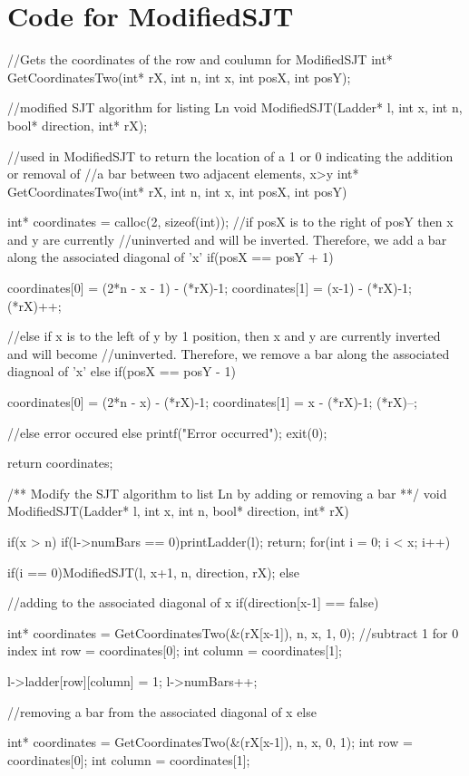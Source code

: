 \section{Code for {\sc ModifiedSJT}}

\begin{singlespace}
\begin{footnotesize}
\begin{code}
//Gets the coordinates of the row and coulumn for ModifiedSJT
int* GetCoordinatesTwo(int* rX, int n, int x, int posX, int posY);


//modified SJT algorithm for listing Ln
void ModifiedSJT(Ladder* l, int x, int n, bool* direction, int* rX);

//used in ModifiedSJT to return the location of a 1 or 0 indicating the addition or removal of 
//a bar between two adjacent elements, x>y
int* GetCoordinatesTwo(int* rX, int n, int x, int posX, int posY)
{
	int* coordinates = calloc(2, sizeof(int));
	//if posX is to the right of posY then x and y are currently 
	//uninverted and will be inverted. Therefore, we add a bar along the associated diagonal of 'x'
	if(posX == posY + 1)
	{
		coordinates[0] = (2*n - x - 1) - (*rX)-1;
		coordinates[1] = (x-1) - (*rX)-1;
		(*rX)++;

	}
	//else if x is to the left of y by 1 position, then x and y are currently inverted and will become 
	//uninverted. Therefore, we remove a bar along the associated diagnoal of 'x'
	else if(posX == posY - 1)
	{

		coordinates[0] = (2*n - x) - (*rX)-1;
		coordinates[1] = x - (*rX)-1;
		(*rX)--;

	}
	//else error occured
	else 
	{
		printf("Error occurred\n");
		exit(0);
	}

	return coordinates;
}

/** 
Modify the SJT algorithm to list Ln by adding or removing a bar
**/
void ModifiedSJT(Ladder* l, int x, int n, bool* direction, int* rX)
{
	if(x > n)
	{
		if(l->numBars == 0)printLadder(l);
		return;
	}
	for(int i = 0; i < x; i++)
	{
		if(i == 0)ModifiedSJT(l, x+1, n, direction, rX);
		else 
		{
			//adding to the associated diagonal of x
			if(direction[x-1] == false)
			{
				int* coordinates = GetCoordinatesTwo(&(rX[x-1]), n, x, 1, 0);
				//subtract 1 for 0 index
				int row = coordinates[0];
				int column = coordinates[1];

				l->ladder[row][column] = 1;
				l->numBars++;

			}
			//removing a bar from the associated diagonal of x
			else{
				int* coordinates = GetCoordinatesTwo(&(rX[x-1]), n, x, 0, 1);
				int row = coordinates[0];
				int column = coordinates[1];


}}}}
\end{code}
\end{footnotesize}
\end{singlespace}
